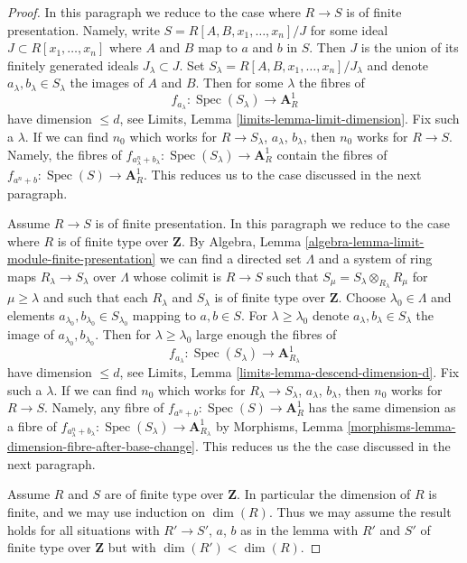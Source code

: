 \documentclass[10pt,a4paper]{amsart}
\theoremstyle{plain}
\theoremstyle{definition}
\theoremstyle{remark}
\numberwithin{equation}{subsection}
\def\Spec{\mathop{\mathrm{Spec}}}
\begin{document}
\begin{proof}
In this paragraph we reduce to the case where $R \to S$ is of finite
presentation. Namely, write $S = R[A, B, x_1, \ldots, x_n]/J$ for some ideal
$J \subset R[x_1, \ldots, x_n]$ where $A$ and $B$ map to $a$ and $b$ in $S$.
Then $J$ is the union of its finitely generated ideals $J_\lambda \subset J$.
Set $S_\lambda = R[A, B, x_1, \ldots, x_n]/J_\lambda$ and
denote $a_\lambda, b_\lambda \in S_\lambda$ the images of $A$ and $B$.
Then for some $\lambda$ the fibres of
$$
f_{a_\lambda} : \Spec(S_\lambda) \longrightarrow \mathbf{A}^1_R
$$
have dimension $\leq d$, see Limits, Lemma \ref{limits-lemma-limit-dimension}.
Fix such a $\lambda$. If we can find $n_0$ which works for $R \to S_\lambda$,
$a_\lambda$, $b_\lambda$, then $n_0$ works for $R \to S$. Namely, the fibres
of $f_{a_\lambda^n + b_\lambda} : \Spec(S_\lambda) \to \mathbf{A}^1_R$
contain the fibres of $f_{a^n + b} : \Spec(S) \to \mathbf{A}^1_R$.
This reduces us to the case discussed in the next paragraph.

\medskip\noindent
Assume $R \to S$ is of finite presentation. In this paragraph we reduce
to the case where $R$ is of finite type over $\mathbf{Z}$. By
Algebra, Lemma \ref{algebra-lemma-limit-module-finite-presentation}
we can find a directed set $\Lambda$ and a system of ring maps
$R_\lambda \to S_\lambda$ over $\Lambda$ whose colimit is
$R \to S$ such that $S_\mu = S_\lambda \otimes_{R_\lambda} R_\mu$
for $\mu \geq \lambda$ and such that each $R_\lambda$ and $S_\lambda$
is of finite type over $\mathbf{Z}$. Choose $\lambda_0 \in \Lambda$ and
elements $a_{\lambda_0}, b_{\lambda_0} \in S_{\lambda_0}$ mapping to
$a, b \in S$. For $\lambda \geq \lambda_0$ denote
$a_\lambda, b_\lambda \in S_\lambda$
the image of $a_{\lambda_0}, b_{\lambda_0}$.
Then for $\lambda \geq \lambda_0$ large enough the fibres of
$$
f_{a_\lambda} : 
\Spec(S_\lambda) \longrightarrow \mathbf{A}^1_{R_\lambda}
$$
have dimension $\leq d$, see
Limits, Lemma \ref{limits-lemma-descend-dimension-d}.
Fix such a $\lambda$. If we can find $n_0$ which works for
$R_\lambda \to S_\lambda$, $a_\lambda$, $b_\lambda$, then $n_0$
works for $R \to S$. Namely, any fibre of
$f_{a^n + b} : \Spec(S) \to \mathbf{A}^1_R$
has the same dimension as a fibre of
$f_{a_\lambda^n + b_\lambda} : \Spec(S_\lambda) \to \mathbf{A}^1_{R_\lambda}$
by Morphisms, Lemma \ref{morphisms-lemma-dimension-fibre-after-base-change}.
This reduces us the the case discussed in the next paragraph.

\medskip\noindent
Assume $R$ and $S$ are of finite type over $\mathbf{Z}$. In particular
the dimension of $R$ is finite, and we may use induction on $\dim(R)$.
Thus we may assume the result holds for all situations with
$R' \to S'$, $a$, $b$ as in the lemma with $R'$ and $S'$ of finite type
over $\mathbf{Z}$ but with $\dim(R') < \dim(R)$.


\end{proof}
\end{document}
